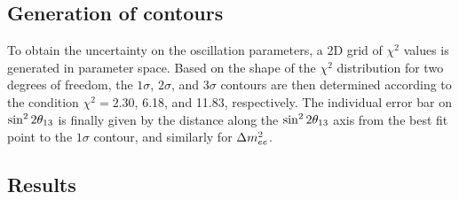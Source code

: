 \documentclass[../thesis.tex]{subfiles}
\begin{document}
\begin{comment}
Just take $(Fpred_i - Fobs_i)V^{-1}_{ij}(Fpred_j - Fobs_j)$
\end{comment}

\subsection{Generation of contours}
\label{sec:fitContours}

To obtain the uncertainty on the oscillation parameters, a 2D grid of $\chi^2$ values is generated in parameter space. Based on the shape of the $\chi^2$ distribution for two degrees of freedom, the $1\sigma$, $2\sigma$, and $3\sigma$ contours are then determined according to the condition $\chi^2 = 2.30$, 6.18, and 11.83, respectively. The individual error bar on $\sin^2 2\theta_{13}$ is finally given by the distance along the $\sin^2 2\theta_{13}$ axis from the best fit point to the $1\sigma$ contour, and similarly for $\Delta m^2_{ee}$.

\begin{comment}
Generate map of chi2 in oscillation parameter space. Take the 1sigma contour based on where the chi2 falls to XXX, etc.
\end{comment}

\subsection{Results}
\label{sec:fitResults}
\end{document}
